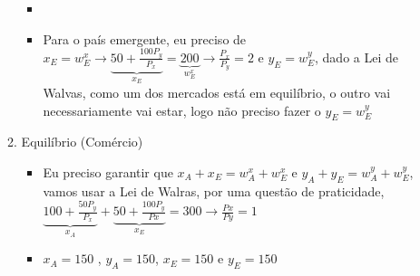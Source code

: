 \documentclass[a4paper,12pt]{article}[abntex2]
\begin{document}
\begin{enumerate}
\begin{enumerate}
\begin{itemize}
        \item \item Para o país emergente, eu preciso de \(x_E=w_E^x\rightarrow \underbrace{50+\frac{100P_y}{P_x}}_{x_E}=\underbrace{200}_{w_E^x}\rightarrow \frac{P_x}{P_y}=2\) e \(y_E=w_E^y\), dado a Lei de Walvas, como um dos mercados está em equilíbrio, o outro vai necessariamente vai estar, logo não preciso fazer o \(y_E=w_E^y\)
    \end{itemize}
    \item Equilíbrio (Comércio)\begin{itemize}
        \item Eu preciso garantir que \(x_A+x_E=w_A^x+w_E^x\) e \(y_A+y_E=w_A^y+w_E^y\), vamos usar a Lei de Walras, por uma questão de praticidade, \(\underbrace{100+\frac{50P_y}{P_x}}_{x_A}+\underbrace{50+\frac{100P_y}{Px}}_{x_E}=300\rightarrow\frac{Px}{Py}=1\)
        \item \(x_A=150\) , \(y_A=150\), \(x_E=150\) e \(y_E=150\) 
    \end{itemize}
    

\end{enumerate}
\end{enumerate}
\end{document}
